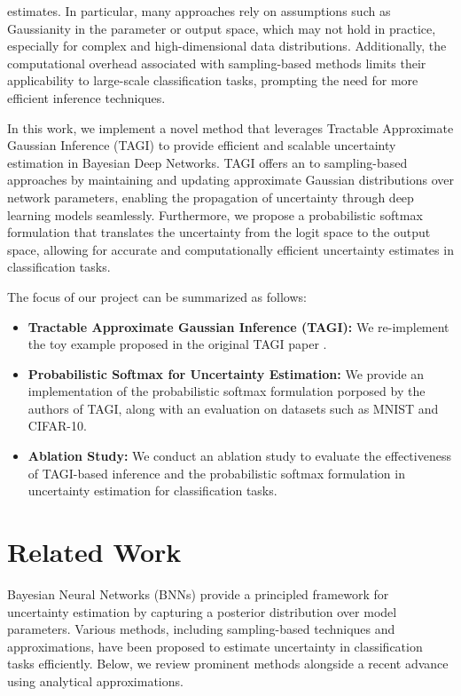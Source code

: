 \documentclass{article}
\begin{document}
estimates. In particular, many approaches rely on assumptions such as Gaussianity in the parameter or output space, which may not hold in practice, especially for complex and high-dimensional data distributions. Additionally, the computational overhead associated with sampling-based methods limits their applicability to large-scale classification tasks, prompting the need for more efficient inference techniques.

In this work, we implement a novel method that leverages Tractable Approximate Gaussian Inference (TAGI) to provide efficient and scalable uncertainty estimation in Bayesian Deep Networks. TAGI offers an to sampling-based approaches by maintaining and updating approximate Gaussian distributions over network parameters, enabling the propagation of uncertainty through deep learning models seamlessly. Furthermore, we propose a probabilistic softmax formulation that translates the uncertainty from the logit space to the output space, allowing for accurate and computationally efficient uncertainty estimates in classification tasks.

The focus of our project can be summarized as follows:

\begin{itemize}
    \item \textbf{Tractable Approximate Gaussian Inference (TAGI):} We re-implement the toy example proposed in the original TAGI paper \cite{goulet2020tractable}.
    \item \textbf{Probabilistic Softmax for Uncertainty Estimation:} We provide an implementation of the probabilistic softmax formulation porposed by the authors of TAGI, along with an evaluation on datasets such as MNIST and CIFAR-10.
    \item \textbf{Ablation Study:} We conduct an ablation study to evaluate the effectiveness of TAGI-based inference and the probabilistic softmax formulation in uncertainty estimation for classification tasks.
\end{itemize}

\section{Related Work}\label{sec:related_work}
Bayesian Neural Networks (BNNs) provide a principled framework for uncertainty estimation by capturing a posterior distribution over model parameters. Various methods, including sampling-based techniques and approximations, have been proposed to estimate uncertainty in classification tasks efficiently. Below, we review prominent methods alongside a recent advance using analytical approximations.
\end{document}
